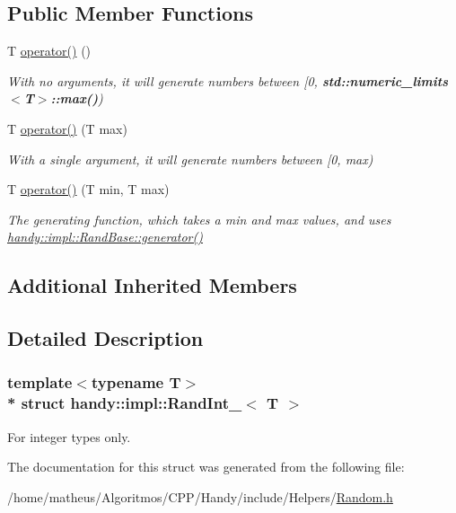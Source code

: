 \subsection*{Public Member Functions}
\begin{DoxyCompactItemize}
\item 
T \hyperlink{group__RandomGroup_gaf1314be58129341263aadf0e74ef44da}{operator()} ()
\begin{DoxyCompactList}\small\item\em With no arguments, it will generate numbers between \mbox{[}0, {\bf std\+::numeric\+\_\+limits$<$\+T$>$\+::max()}) \end{DoxyCompactList}\item 
T \hyperlink{group__RandomGroup_gae6a2e95b745f7e9f9fadee0e9bab54f9}{operator()} (T max)
\begin{DoxyCompactList}\small\item\em With a single argument, it will generate numbers between \mbox{[}0, max) \end{DoxyCompactList}\item 
T \hyperlink{group__RandomGroup_gaae84dc62705bd77108f258555fa89925}{operator()} (T min, T max)
\begin{DoxyCompactList}\small\item\em The generating function, which takes a {\ttfamily min} and {\ttfamily max} values, and uses \hyperlink{group__RandomGroup_gaecbff587706065e3d20a81de01123c9f}{handy\+::impl\+::\+Rand\+Base\+::generator()} \end{DoxyCompactList}\end{DoxyCompactItemize}
\subsection*{Additional Inherited Members}


\subsection{Detailed Description}
\subsubsection*{template$<$typename T$>$\\*
struct handy\+::impl\+::\+Rand\+Int\+\_\+$<$ T $>$}

For integer types only. 

The documentation for this struct was generated from the following file\+:\begin{DoxyCompactItemize}
\item 
/home/matheus/\+Algoritmos/\+C\+P\+P/\+Handy/include/\+Helpers/\hyperlink{Random_8h}{Random.\+h}\end{DoxyCompactItemize}

